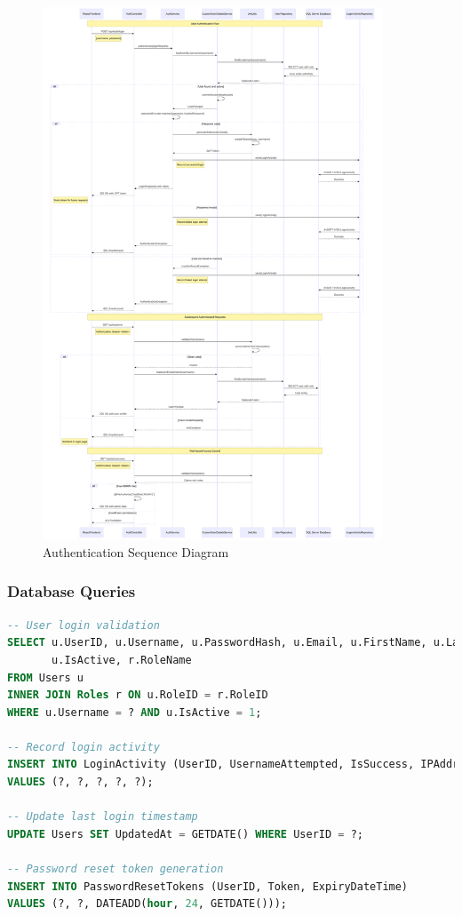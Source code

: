 \documentclass[12pt,a4paper]{article}
\begin{document}
\begin{figure}[H]
\centering
\includegraphics[width=0.9\textwidth]{diagrams/authentication_sequence.svg}
\caption{Authentication Sequence Diagram}
\label{fig:auth-sequence}
\end{figure}

\subsubsection{Database Queries}

\begin{lstlisting}[language=SQL, caption=User Authentication Queries]
-- User login validation
SELECT u.UserID, u.Username, u.PasswordHash, u.Email, u.FirstName, u.LastName, 
       u.IsActive, r.RoleName
FROM Users u
INNER JOIN Roles r ON u.RoleID = r.RoleID
WHERE u.Username = ? AND u.IsActive = 1;

-- Record login activity
INSERT INTO LoginActivity (UserID, UsernameAttempted, IsSuccess, IPAddress, UserAgent)
VALUES (?, ?, ?, ?, ?);

-- Update last login timestamp
UPDATE Users SET UpdatedAt = GETDATE() WHERE UserID = ?;

-- Password reset token generation
INSERT INTO PasswordResetTokens (UserID, Token, ExpiryDateTime)
VALUES (?, ?, DATEADD(hour, 24, GETDATE()));
\end{lstlisting}
\end{document}
